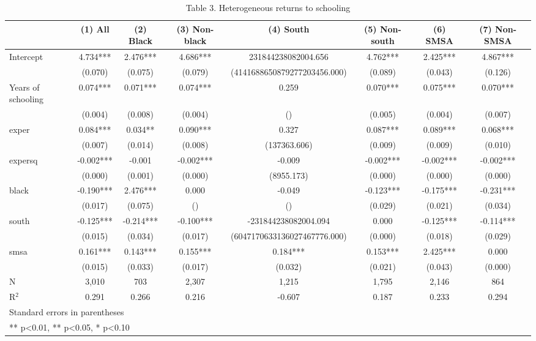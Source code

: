\begin{table}[htbp]
\centering
\caption{Table 3. Heterogeneous returns to schooling}
\begin{tabular}{lccccccc}
\hline\hline
 & (1) All & (2) Black & (3) Non-black & (4) South & (5) Non-south & (6) SMSA & (7) Non-SMSA \\
\hline
Intercept & 4.734*** & 2.476*** & 4.686*** & 231844238082004.656 & 4.762*** & 2.425*** & 4.867*** \\
 & (0.070) & (0.075) & (0.079) & (4141688650879277203456.000) & (0.089) & (0.043) & (0.126) \\
Years of schooling & 0.074*** & 0.071*** & 0.074*** & 0.259 & 0.070*** & 0.075*** & 0.070*** \\
 & (0.004) & (0.008) & (0.004) & () & (0.005) & (0.004) & (0.007) \\
exper & 0.084*** & 0.034** & 0.090*** & 0.327 & 0.087*** & 0.089*** & 0.068*** \\
 & (0.007) & (0.014) & (0.008) & (137363.606) & (0.009) & (0.009) & (0.010) \\
expersq & -0.002*** & -0.001 & -0.002*** & -0.009 & -0.002*** & -0.002*** & -0.002*** \\
 & (0.000) & (0.001) & (0.000) & (8955.173) & (0.000) & (0.000) & (0.000) \\
black & -0.190*** & 2.476*** & 0.000 & -0.049 & -0.123*** & -0.175*** & -0.231*** \\
 & (0.017) & (0.075) & () & () & (0.029) & (0.021) & (0.034) \\
south & -0.125*** & -0.214*** & -0.100*** & -231844238082004.094 & 0.000 & -0.125*** & -0.114*** \\
 & (0.015) & (0.034) & (0.017) & (6047170633136027467776.000) & (0.000) & (0.018) & (0.029) \\
smsa & 0.161*** & 0.143*** & 0.155*** & 0.184*** & 0.153*** & 2.425*** & 0.000 \\
 & (0.015) & (0.033) & (0.017) & (0.032) & (0.021) & (0.043) & (0.000) \\
\hline
N & 3,010 & 703 & 2,307 & 1,215 & 1,795 & 2,146 & 864 \\
R$^2$ & 0.291 & 0.266 & 0.216 & -0.607 & 0.187 & 0.233 & 0.294 \\
\hline\hline
\multicolumn{8}{l}{\footnotesize Standard errors in parentheses} \\
\multicolumn{8}{l}{\footnotesize *** p<0.01, ** p<0.05, * p<0.10} \\
\end{tabular}
\end{table}